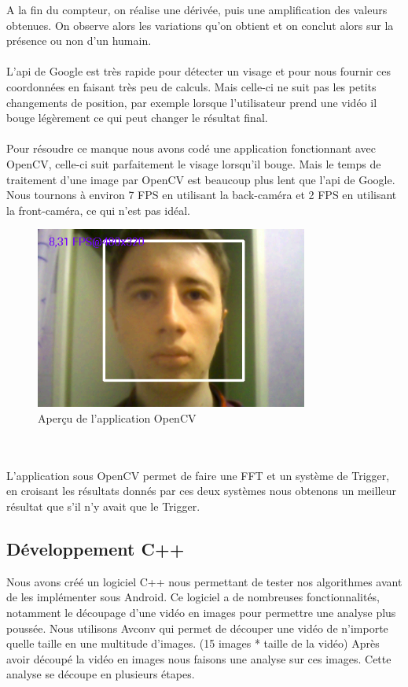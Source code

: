 A la fin du compteur, on réalise une dérivée, puis une amplification des valeurs obtenues. On observe alors les variations qu'on obtient et on conclut alors sur la présence ou non d'un humain.\\
\\
L'api de Google est très rapide pour détecter un visage et pour nous fournir ces coordonnées en faisant très peu de calculs. Mais celle-ci ne suit pas les petits changements de position, par exemple lorsque l'utilisateur prend une vidéo il bouge légèrement ce qui peut changer le résultat final.\\
\\
Pour résoudre ce manque nous avons codé une application fonctionnant avec OpenCV, celle-ci suit parfaitement le visage lorsqu'il bouge. Mais le temps de traitement d'une image par OpenCV est beaucoup plus lent que l'api de Google. Nous tournons à environ 7 FPS en utilisant la back-caméra et 2 FPS en utilisant la front-caméra, ce qui n'est pas idéal.
\begin{figure}[h!]
	\centering
	\includegraphics[width=0.8\textwidth]{data/opencv.png}
	\caption{Aperçu de l'application OpenCV}
\end{figure}
\\
\\
L'application sous OpenCV permet de faire une FFT et un système de Trigger, en croisant les résultats donnés par ces deux systèmes nous obtenons un meilleur résultat que s'il n'y avait que le Trigger.

\subsection{Développement C++}

Nous avons créé un logiciel C++ nous permettant de tester nos algorithmes avant de les implémenter sous Android.
Ce logiciel a de nombreuses fonctionnalités, notamment le découpage d'une vidéo en images pour permettre une analyse plus poussée.
Nous utilisons Avconv qui permet de découper une vidéo de n'importe quelle taille en une multitude d'images. (15 images * taille de la vidéo)
Après avoir découpé la vidéo en images nous faisons une analyse sur ces images.
Cette analyse se découpe en plusieurs étapes.\\


